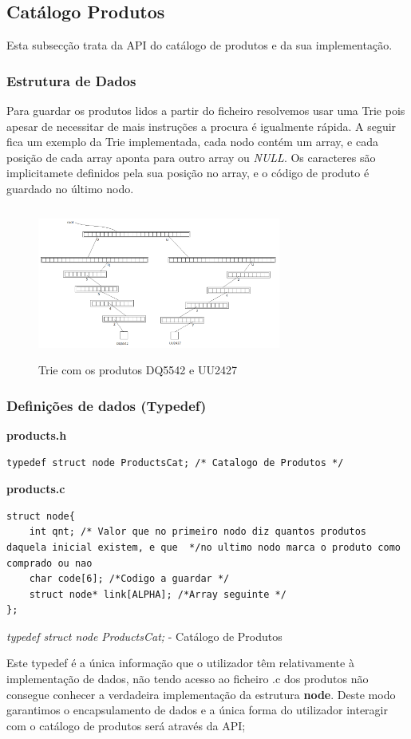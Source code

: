 \documentclass[10pt] {article}
\begin{document}

\newpage
\subsection{Catálogo Produtos}
\par Esta subsecção trata da API do catálogo de produtos e da sua implementação.

\subsubsection{Estrutura de Dados}
\par
Para guardar os produtos lidos a partir do ficheiro resolvemos usar uma Trie pois apesar de necessitar de mais instruções a procura é igualmente rápida. A seguir fica um exemplo da Trie implementada, cada nodo contém um array, e cada posição de cada array aponta para outro array ou \emph{NULL}. Os caracteres são implicitamete definidos pela sua posição no array, e o código de produto é guardado no último nodo.


\begin{figure}[ht!]
\centering
\includegraphics[width=80mm, height=50mm]{trie2.png}
\caption{Trie com os produtos DQ5542 e UU2427}
\end{figure}

\subsubsection{Definições de dados (Typedef)}

\noindent\textbf{products.h}
\begin{lstlisting}
typedef struct node ProductsCat; /* Catalogo de Produtos */
\end{lstlisting}
\textbf{products.c}
\begin{lstlisting}
struct node{
	int qnt; /* Valor que no primeiro nodo diz quantos produtos daquela inicial existem, e que  */no ultimo nodo marca o produto como comprado ou nao
	char code[6]; /*Codigo a guardar */
	struct node* link[ALPHA]; /*Array seguinte */
};
\end{lstlisting}
\emph{typedef struct node ProductsCat;} - Catálogo de Produtos
\par Este typedef é a única informação que o utilizador têm relativamente à implementação de dados, não tendo
acesso ao ficheiro .c dos produtos não consegue conhecer a verdadeira implementação da estrutura \textbf{node}.
Deste modo garantimos o encapsulamento de dados e a única forma do utilizador interagir com o catálogo de
produtos será através da API;
\end{document}
